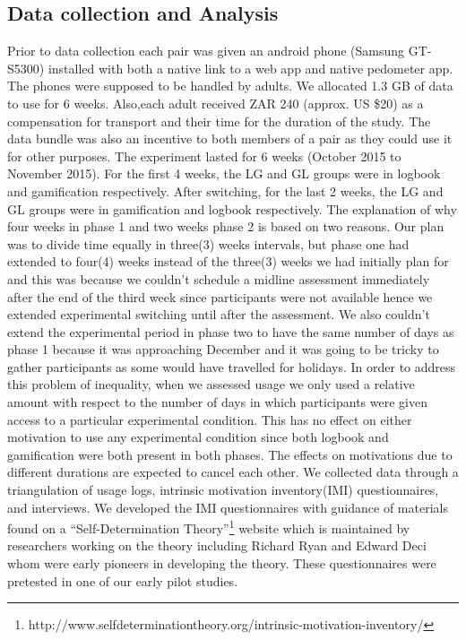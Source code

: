 \documentclass{sig-alternate}
\begin{document}
\subsection{Data collection and Analysis} 
Prior to data collection each pair was given an android phone (Samsung
GT-S5300) installed with both a native link to a web app and native pedometer app. The phones were supposed to be handled by adults. We allocated 1.3 GB of data to use for 6 weeks. Also,each adult received ZAR 240 (approx. US \$20) as a compensation for transport and their time for the duration of the study. The data bundle was also an incentive to both members of a pair as they could use it for other purposes. \newline
The experiment lasted for 6 weeks (October 2015 to November 2015). For the first 4 weeks, the LG and GL groups were in logbook and gamification respectively. After switching, for the last 2 weeks, the LG and GL groups were in gamification and logbook respectively. The explanation of why four weeks in phase 1 and two weeks phase 2 is based on two reasons. Our plan was to divide time equally in three(3) weeks intervals, but phase one had extended to four(4) weeks instead of the three(3) weeks we had initially plan for and this was because we couldn't schedule a midline assessment immediately after the end of the third week since participants were not available hence we extended experimental switching until after the assessment. We also couldn't extend the experimental period in phase two to have the same number of days as phase 1 because it was approaching December and it was going to be tricky to gather participants as some would have travelled for holidays. In order to address this problem of inequality, when we assessed usage we only used a relative amount with respect to the number of days in which participants were given access to a particular experimental condition. This has no effect on either motivation to use any experimental condition since both logbook and gamification were both present in both phases. The effects on motivations due to different durations are expected to cancel each other.\newline
We collected data through a triangulation of usage logs, intrinsic motivation inventory(IMI) questionnaires, and interviews. We developed the IMI questionnaires with guidance of materials found on a ``Self-Determination Theory''\footnote{http://www.selfdeterminationtheory.org/intrinsic-motivation-inventory/} website which is maintained by researchers working on the theory including Richard Ryan and Edward Deci\cite{deci1985intrinsic} whom were early pioneers in developing the theory. These questionnaires were pretested in one of our early pilot studies.\newline
\end{document}
